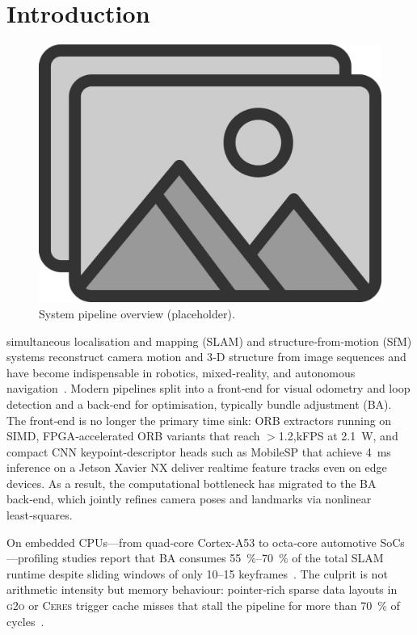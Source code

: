 \section{Introduction}\label{sec:intro}


\begin{figure}[t]
  \centering
  \includegraphics[width=0.9\linewidth]{figs/placeholder}
  \caption{System pipeline overview (placeholder).}
  \label{fig:intro_pipeline}
\end{figure}

 simultaneous localisation and mapping (SLAM) and structure‑from‑motion (SfM) systems 
reconstruct camera motion and 3‑D structure from image sequences and have become indispensable in robotics, 
mixed‑reality, and autonomous navigation~\cite{cadena2016past,hartley2003multiple}.
Modern pipelines split into a front‑end for visual odometry and loop detection and a back‑end for optimisation, typically 
bundle adjustment (BA)\cite{campos2021orb}.
The front‑end is no longer the primary time sink: ORB extractors running on SIMD\cite{rublee2011orb}, FPGA‑accelerated 
ORB variants that reach $>$1.2,kFPS at \SI{2.1}{\watt}\cite{wang2022fpga_orb}, and compact CNN keypoint‑descriptor heads such 
as MobileSP that achieve \SI{4}{ms} inference on a Jetson Xavier NX\cite{zhang2022mobilesp} deliver 
realtime feature tracks even on edge devices.
As a result, the computational bottleneck has migrated to the BA back‑end, which jointly refines camera poses and landmarks 
via nonlinear least‑squares.

On embedded CPUs—from quad‑core Cortex‑A53 to octa‑core automotive SoCs—profiling studies report that BA consumes 
\SIrange{55}{70}{\percent} of the total SLAM runtime despite sliding windows of only 10–15 keyframes~\cite{matthee2024predicting}.
The culprit is not arithmetic intensity but memory behaviour: pointer‑rich sparse data layouts in \textsc{g2o} or \textsc{Ceres} 
trigger cache misses that stall the pipeline for more than 70 \% of cycles~\cite{triggs1999bundle}.

















